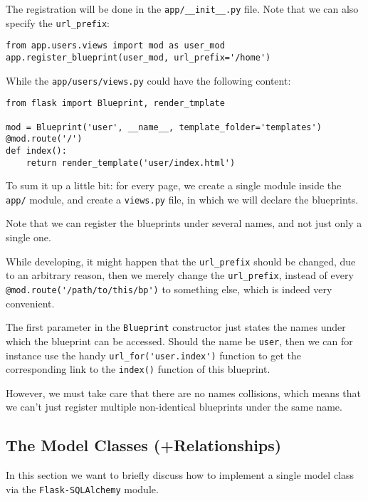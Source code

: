 \documentclass[../main/main.tex]{subfiles}
\begin{document}
The registration will be done in the \lstinline|app/__init__.py|
file. Note that we can also specify the \lstinline|url_prefix|: 

\begin{lstlisting}
from app.users.views import mod as user_mod
app.register_blueprint(user_mod, url_prefix='/home')
\end{lstlisting}

While the \lstinline|app/users/views.py| could have the following
content:

\begin{lstlisting}
from flask import Blueprint, render_tmplate

mod = Blueprint('user', __name__, template_folder='templates')
@mod.route('/')
def index():
    return render_template('user/index.html')
\end{lstlisting}

To sum it up a little bit: for every page, we create a single module
inside the \lstinline|app/| module, and create a \lstinline|views.py|
file, in which we will declare the blueprints. 

Note that we can register the blueprints under several names, and not
just only a single one. 

While developing, it might happen that the \lstinline|url_prefix|
should be changed, due to an arbitrary reason, then we merely change
the \lstinline|url_prefix|, instead of every
\lstinline|@mod.route('/path/to/this/bp')| to something else, which is
indeed very convenient.

The first parameter in the \lstinline|Blueprint| constructor just
states the names under which the blueprint can be accessed. Should the
name be \lstinline|user|, then we can for instance use the handy
\lstinline|url_for('user.index')| function to get the corresponding
link to the \lstinline|index()| function of this blueprint. 

However, we must take care that there are no names collisions, which
means that we can't just register multiple non-identical blueprints
under the same name. 


\subsection{The Model Classes (+Relationships)}

In this section we want to briefly discuss how to implement a single
model class via the \lstinline|Flask-SQLAlchemy| module. 
\end{document}
